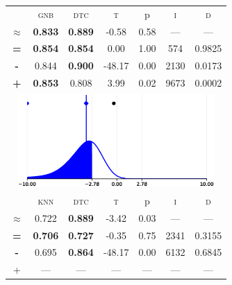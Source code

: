 \begin{tabular}{c||cc||c|c|c||c}
\midrule	&\textsc{gnb} & \textsc{dtc} & \textsc{t} & p & \textsc{i} & \textsc{d}\\
	\color{black} $\approx$ & \color{black} \bfseries 0.833 &\color{black}  \bfseries 0.889 & -0.58 & 0.58 & --- & ---\\\midrule
	{\bfseries\color{black}\tiny=}& \color{black} \bfseries 0.854 & \color{black} \bfseries 0.854 & 0.00 & 1.00 & 574 & \color{black} 0.9825\\
	{\bfseries\color{blue}\tiny-}& \color{blue}  0.844 & \color{blue} \bfseries 0.900 & -48.17 & 0.00 & 2130 & \color{blue} 0.0173\\
	{\bfseries\color{red}\tiny+}& \color{red} \bfseries 0.853 & \color{red}  0.808 & 3.99 & 0.02 & 9673 & \color{red} 0.0002\\
	\bottomrule
	\multicolumn{7}{c}{\includegraphics[width=7.5cm, trim=30 0 30 0]{figures/cryotherapy_2.eps}}\\

\midrule	&\textsc{knn} & \textsc{dtc} & \textsc{t} & p & \textsc{i} & \textsc{d}\\
	\color{blue} $\approx$ & \color{blue}  0.722 &\color{blue}  \bfseries 0.889 & -3.42 & 0.03 & --- & ---\\\midrule
	{\bfseries\color{black}\tiny=}& \color{black} \bfseries 0.706 & \color{black} \bfseries 0.727 & -0.35 & 0.75 & 2341 & \color{black} 0.3155\\
	{\bfseries\color{blue}\tiny-}& \color{blue}  0.695 & \color{blue} \bfseries 0.864 & -48.17 & 0.00 & 6132 & \color{blue} 0.6845\\
	{\tiny+}& --- & --- & --- & --- & --- & ---\\
\bottomrule\end{tabular}



